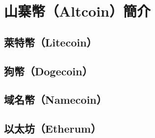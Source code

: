 	\section{山寨幣（Altcoin）簡介}

		\subsection{萊特幣（Litecoin）}

		\subsection{狗幣（Dogecoin）}

		\subsection{域名幣（Namecoin）}

		\subsection{以太坊（Etherum）}

